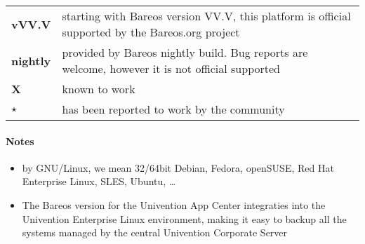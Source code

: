 \begin{tabular}[h]{l l}
\textbf{vVV.V}   & starting with Bareos version VV.V, this platform is official supported by the Bareos.org project \\
\textbf{nightly} & provided by Bareos nightly build. Bug reports are welcome, however it is not official supported \\
\textbf{X}       & known to work \\
\textbf{$\star$} & has been reported to work by the community\\
\end{tabular}


\paragraph{Notes}

\begin{itemize}
    \item by GNU/Linux, we mean 32/64bit Debian, Fedora, openSUSE, Red Hat Enterprise Linux, SLES, Ubuntu, \dots
    \item {The Bareos version for the Univention App Center integraties into the Univention Enterprise Linux environment, making it easy to backup all the systems managed by the central Univention Corporate Server}
\end{itemize}
